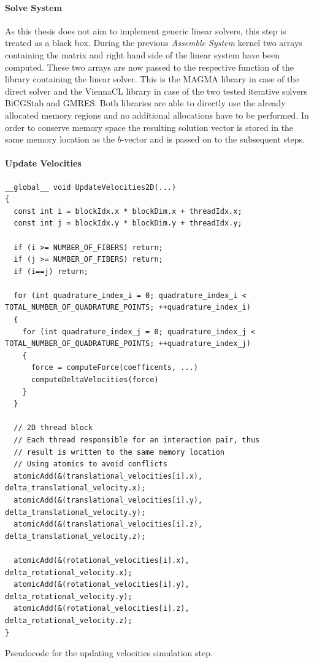 \documentclass[a4paper,11pt]{kth-mag}
\begin{document}
\paragraph{Solve System}
As this thesis does not aim to implement generic linear solvers, this step is treated as a black box. During the previous \emph{Assemble System} kernel two arrays containing the matrix and right hand side of the linear system have been computed. These two arrays are now passed to the respective function of the library containing the linear solver. This is the MAGMA library in case of the direct solver and the ViennaCL library in case of the two tested iterative solvers BiCGStab and GMRES. Both libraries are able to directly use the already allocated memory regions and no additional allocations have to be performed. In order to conserve memory space the resulting solution vector is stored in the same memory location as the $b$-vector and is passed on to the subsequent steps.

\paragraph{Update Velocities}

\begin{listing}
  \centering
  \begin{verbatim}
__global__ void UpdateVelocities2D(...)
{
  const int i = blockIdx.x * blockDim.x + threadIdx.x;
  const int j = blockIdx.y * blockDim.y + threadIdx.y;

  if (i >= NUMBER_OF_FIBERS) return;
  if (j >= NUMBER_OF_FIBERS) return;
  if (i==j) return;

  for (int quadrature_index_i = 0; quadrature_index_i < TOTAL_NUMBER_OF_QUADRATURE_POINTS; ++quadrature_index_i)
  {
    for (int quadrature_index_j = 0; quadrature_index_j < TOTAL_NUMBER_OF_QUADRATURE_POINTS; ++quadrature_index_j)
    {
      force = computeForce(coefficents, ...)
      computeDeltaVelocities(force)
    }
  }

  // 2D thread block
  // Each thread responsible for an interaction pair, thus
  // result is written to the same memory location
  // Using atomics to avoid conflicts
  atomicAdd(&(translational_velocities[i].x), delta_translational_velocity.x);
  atomicAdd(&(translational_velocities[i].y), delta_translational_velocity.y);
  atomicAdd(&(translational_velocities[i].z), delta_translational_velocity.z);

  atomicAdd(&(rotational_velocities[i].x), delta_rotational_velocity.x);
  atomicAdd(&(rotational_velocities[i].y), delta_rotational_velocity.y);
  atomicAdd(&(rotational_velocities[i].z), delta_rotational_velocity.z);
}
  \end{verbatim}
  \caption{Pseudocode for the updating velocities simulation step.}
  \label{lst:pseudo_update_velocities}
\end{listing}
\end{document}
